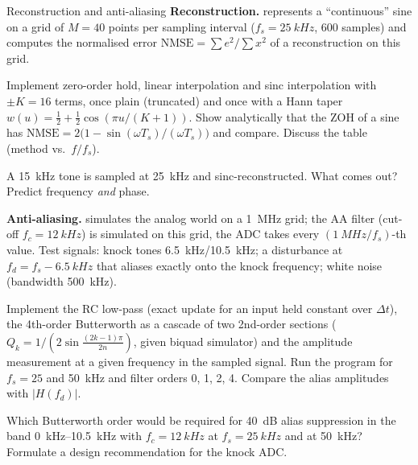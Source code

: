 \begin{exercise}{Reconstruction and anti-aliasing}{\JSLinux}
\textbf{Reconstruction.}  represents a
``continuous'' sine on a grid of $M=40$ points per sampling interval
($f_s=\SI{25}{kHz}$, \num{600} samples) and computes the normalised error
$\mathrm{NMSE}=\sum e^2/\sum x^2$ of a reconstruction on this grid.
\begin{tasks}
  \item Implement zero-order hold, linear interpolation and sinc
    interpolation with $\pm K=16$ terms, once plain (truncated) and once with
    a Hann taper $w(u)=\tfrac12+\tfrac12\cos(\pi u/(K+1))$. Show analytically
    that the ZOH of a sine has
    $\mathrm{NMSE}=2\bigl(1-\sin(\omega T_s)/(\omega T_s)\bigr)$ and compare.
    Discuss the table (method vs.\ $f/f_s$).
  \item A \SI{15}{kHz} tone is sampled at \SI{25}{kHz} and sinc-reconstructed.
    What comes out? Predict frequency \emph{and} phase.
\end{tasks}
\textbf{Anti-aliasing.}  simulates the
analog world on a \SI{1}{MHz} grid; the AA filter (cut-off $f_c=\SI{12}{kHz}$)
is simulated on this grid, the ADC takes every $(\SI{1}{MHz}/f_s)$-th value.
Test signals: knock tones \SI{6.5}{kHz}/\SI{10.5}{kHz}; a disturbance at
$f_d=f_s-\SI{6.5}{kHz}$ that aliases exactly onto the knock frequency; white
noise (bandwidth \SI{500}{kHz}).
\begin{tasks}[resume]
  \item Implement the RC low-pass (exact update for an input held constant
    over $\Delta t$), the 4th-order Butterworth as a cascade of two
    2nd-order sections ($Q_k=1/(2\sin\frac{(2k-1)\pi}{2n})$, given biquad
    simulator) and the amplitude measurement at a given frequency in the
    sampled signal. Run the program for $f_s=25$ and \SI{50}{kHz} and filter
    orders 0, 1, 2, 4. Compare the alias amplitudes with $|H(f_d)|$.
  \item Which Butterworth order would be required for \SI{40}{dB} alias
    suppression in the band \SIrange{0}{10.5}{kHz} with $f_c=\SI{12}{kHz}$ at
    $f_s=\SI{25}{kHz}$ and at \SI{50}{kHz}? Formulate a design
    recommendation for the knock ADC.
\end{tasks}
\end{exercise}

